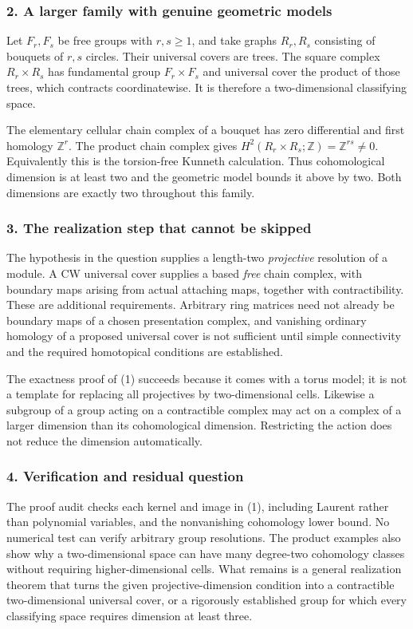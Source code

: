 \documentclass[11pt,a4paper]{article}
\begin{document}
\subsubsection{2. A larger family with genuine geometric models}
Let $F_r,F_s$ be free groups with $r,s\geq1$, and take graphs $R_r,R_s$ consisting of bouquets of $r,s$ circles. Their universal covers are trees. The square complex $R_r\times R_s$ has fundamental group $F_r\times F_s$ and universal cover the product of those trees, which contracts coordinatewise. It is therefore a two-dimensional classifying space.

The elementary cellular chain complex of a bouquet has zero differential and first homology $\mathbb Z^r$. The product chain complex gives $H^2(R_r\times R_s;\mathbb Z)=\mathbb Z^{rs}\ne0$. Equivalently this is the torsion-free Kunneth calculation. Thus cohomological dimension is at least two and the geometric model bounds it above by two. Both dimensions are exactly two throughout this family.

\subsubsection{3. The realization step that cannot be skipped}
The hypothesis in the question supplies a length-two \emph{projective} resolution of a module. A CW universal cover supplies a based \emph{free} chain complex, with boundary maps arising from actual attaching maps, together with contractibility. These are additional requirements. Arbitrary ring matrices need not already be boundary maps of a chosen presentation complex, and vanishing ordinary homology of a proposed universal cover is not sufficient until simple connectivity and the required homotopical conditions are established.

The exactness proof of (1) succeeds because it comes with a torus model; it is not a template for replacing all projectives by two-dimensional cells. Likewise a subgroup of a group acting on a contractible complex may act on a complex of a larger dimension than its cohomological dimension. Restricting the action does not reduce the dimension automatically.

\subsubsection{4. Verification and residual question}
The proof audit checks each kernel and image in (1), including Laurent rather than polynomial variables, and the nonvanishing cohomology lower bound. No numerical test can verify arbitrary group resolutions. The product examples also show why a two-dimensional space can have many degree-two cohomology classes without requiring higher-dimensional cells. What remains is a general realization theorem that turns the given projective-dimension condition into a contractible two-dimensional universal cover, or a rigorously established group for which every classifying space requires dimension at least three.
\end{document}
